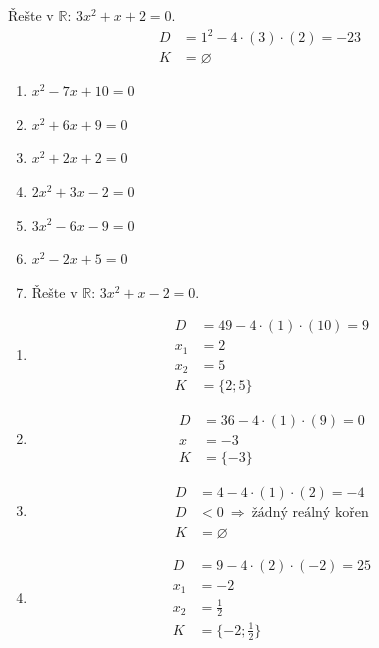 \documentclass[11pt,a4paper]{article}
\begin{document}
\begin{zadaniReseniBox}[title={Rozšíření 1}]
Řešte v $\mathbb R$: $3x^{2} + x + 2=0$.
\tcblower
\[
\begin{aligned}D&=1^2-4\cdot(3)\cdot(2)=-23\\K&=\varnothing\end{aligned}
\]
\end{zadaniReseniBox}

\begin{zadaniReseniBox}[title={Domácí úkol}]
\begin{enumerate}[label=\alph*),itemsep=2pt]
\item $x^{2} - 7x + 10=0$
\item $x^{2} + 6x + 9=0$
\item $x^{2} + 2x + 2=0$
\item $2x^{2} + 3x - 2=0$
\item $3x^{2} - 6x - 9=0$
\item $x^{2} - 2x + 5=0$
\item Řešte v $\mathbb R$: $3x^{2} + x - 2=0$.
\end{enumerate}
\tcblower
\begin{enumerate}[label=\alph*),itemsep=2pt]
\item
\[\begin{aligned}
D&=49-4\cdot(1)\cdot(10)=9\\[2pt]
x_1&=2\\[2pt]
x_2&=5\\[2pt]
K&=\{2;5\}
\end{aligned}\]
\item
\[\begin{aligned}
D&=36-4\cdot(1)\cdot(9)=0\\[2pt]
x&=-3\\[2pt]
K&=\{-3\}
\end{aligned}\]
\item
\[\begin{aligned}
D&=4-4\cdot(1)\cdot(2)=-4\\[2pt]
D&<0\ \Rightarrow\ \text{žádný reálný kořen}\\[2pt]
K&=\varnothing
\end{aligned}\]
\item
\[\begin{aligned}
D&=9-4\cdot(2)\cdot(-2)=25\\[2pt]
x_1&=-2\\[2pt]
x_2&=\frac{1}{2}\\[2pt]
K&=\{-2;\frac{1}{2}\}
\end{aligned}\]

\end{enumerate}
\end{zadaniReseniBox}
\end{document}
